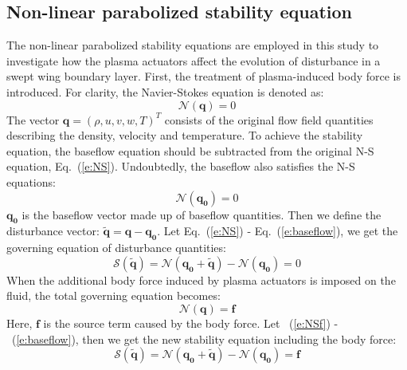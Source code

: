 \documentclass{AIAA}
\begin{document}
\subsection{Non-linear parabolized stability equation}
The non-linear parabolized stability equations are employed in this study to investigate how the plasma actuators affect the evolution of disturbance in a swept wing boundary layer. First, the treatment of plasma-induced body force is introduced. For clarity, the Navier-Stokes equation is denoted as:
\begin{equation}
    \label{e:NS}
    \mathscr{N}(\mathbf{q})=0
\end{equation}
The vector $\mathbf{q}=(\rho , u,v,w,T)^T$ consists of the original flow field quantities describing the density, velocity and temperature. To achieve the stability equation, the baseflow equation should be subtracted from the original N-S equation, Eq.~(\ref{e:NS}). Undoubtedly, the baseflow also satisfies the N-S equations:
\begin{equation}
    \label{e:baseflow}
    \mathscr{N}(\mathbf{q_0})=0
\end{equation}
$\mathbf{q_0}$ is the baseflow vector made up of baseflow quantities. Then we define the disturbance vector: $\mathbf{\tilde{q}}=\mathbf{q}-\mathbf{q_0}$. Let Eq.~(\ref{e:NS}) - Eq.~(\ref{e:baseflow}), we get the governing equation of disturbance quantities:
\begin{equation}
    \label{e:disturbance1}
    \mathscr{S}(\mathbf{\tilde{q}})=\mathscr{N}(\mathbf{q_0}+\mathbf{\tilde{q}})-\mathscr{N}(\mathbf{q_0})=0
\end{equation}
When the additional body force induced by plasma actuators is imposed on the fluid, the total governing equation becomes:
\begin{equation}
    \label{e:NSf}
    \mathscr{N}(\mathbf{q})=\mathbf{f}
\end{equation}
Here, $\mathbf{f}$ is the source term caused by the body force. Let ~(\ref{e:NSf}) -~(\ref{e:baseflow}), then we get the new stability equation including the body force:
\begin{equation}
    \label{e:disturbance2}
    \mathscr{S}(\mathbf{\tilde{q}})=\mathscr{N}(\mathbf{q_0}+\mathbf{\tilde{q}})-\mathscr{N}(\mathbf{q_0})=\mathbf{f}
\end{equation}
\end{document}
